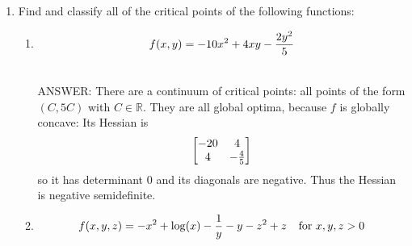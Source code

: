 \documentclass[11pt]{article}
\begin{document}
\begin{enumerate}
\begin{enumerate}
\ \\ANSWER:   It is $$\begin{bmatrix}1 & -1& -1\\ 0& 1& -1\\0&0&1 \end{bmatrix}$$

\item Find the rank of 
$$\begin{bmatrix} 
1& 2& 5\\
-3& 2& -1\\
0& 4& 7\\
2& 0& 3
\end{bmatrix}$$

\ \\ANSWER:  It is 2.

\item Check whether the following matrix is positive definite, positive semidefinite, negative definite, negative semidefinite, or none of the above.
$$\begin{bmatrix}
1& 3& 2\\3& 2& 1\\2& 1& 1
\end{bmatrix}$$

\ \\ANSWER:  It is none of the above (the 2X2 principal minors are different signs).

\end{enumerate}

\vspace{.2in}

\item Find and classify all of the critical points of the following functions:

\begin{enumerate}

\item  $$f(x, y)=-10x^2+4xy-{{2y^2}\over 5}$$


\ \\ANSWER:  There are a continuum of critical points: all points of the form $(C, 5C)$ with $C\in \mathbb{R}$.  They are all global optima, because $f$ is globally concave: Its Hessian is $$\begin{bmatrix}-20 & 4\\4& -{4\over 5}\end{bmatrix}$$ so it has determinant 0 and its diagonals are negative.  Thus the Hessian is negative semidefinite.

\item $$f(x, y, z)=-x^2+{\log}(x)-{1\over y}-y-z^2+z \hspace{.1in}\hbox{ for }x, y, z>0$$


\end{enumerate}
\end{enumerate}
\end{document}

